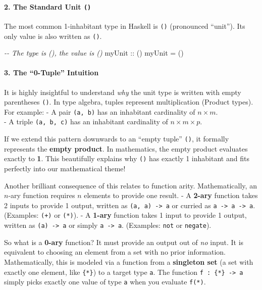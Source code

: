 \documentclass[
]{article}
\newenvironment{Shaded}{}{}
\newcommand{\CommentTok}[1]{\textcolor[rgb]{0.38,0.63,0.69}{\textit{#1}}}
\newcommand{\NormalTok}[1]{#1}
\newcommand{\OtherTok}[1]{\textcolor[rgb]{0.00,0.44,0.13}{#1}}
\begin{document}
\paragraph{\texorpdfstring{2. The Standard Unit
\texttt{()}}{2. The Standard Unit ()}}\label{the-standard-unit}

The most common 1-inhabitant type in Haskell is \texttt{()} (pronounced
``unit''). Its only value is also written as \texttt{()}.

\begin{Shaded}
\begin{Highlighting}[]
\CommentTok{{-}{-} The type is (), the value is ()}
\OtherTok{myUnit ::}\NormalTok{ ()}
\NormalTok{myUnit }\OtherTok{=}\NormalTok{ ()}
\end{Highlighting}
\end{Shaded}

\paragraph{3. The ``0-Tuple'' Intuition}\label{the-0-tuple-intuition}

It is highly insightful to understand \emph{why} the unit type is
written with empty parentheses \texttt{()}. In type algebra, tuples
represent multiplication (Product types). For example: - A pair
\texttt{(a,\ b)} has an inhabitant cardinality of \(n \times m\).\\
- A triple \texttt{(a,\ b,\ c)} has an inhabitant cardinality of
\(n \times m \times p\).

If we extend this pattern downwards to an ``empty tuple'' \texttt{()},
it formally represents the \textbf{empty product}. In mathematics, the
empty product evaluates exactly to \textbf{1}. This beautifully explains
why \texttt{()} has exactly 1 inhabitant and fits perfectly into our
mathematical theme!

Another brilliant consequence of this relates to function arity.
Mathematically, an \(n\)-ary function requires \(n\) elements to provide
one result. - A \textbf{2-ary} function takes 2 inputs to provide 1
output, written as \texttt{(a,\ a)\ -\textgreater{}\ a} or curried as
\texttt{a\ -\textgreater{}\ a\ -\textgreater{}\ a}. (Examples:
\texttt{(+)} or \texttt{(*)}). - A \textbf{1-ary} function takes 1 input
to provide 1 output, written as \texttt{(a)\ -\textgreater{}\ a} or
simply \texttt{a\ -\textgreater{}\ a}. (Examples: \texttt{not} or
\texttt{negate}).

So what is a \textbf{0-ary} function? It must provide an output out of
\emph{no} input. It is equivalent to choosing an element from a set with
no prior information. Mathematically, this is modeled via a function
from a \textbf{singleton set} (a set with exactly one element, like
\texttt{\{*\}}) to a target type \texttt{a}. The function
\texttt{f\ :\ \{*\}\ -\textgreater{}\ a} simply picks exactly one value
of type \texttt{a} when you evaluate \texttt{f(*)}.
\end{document}
